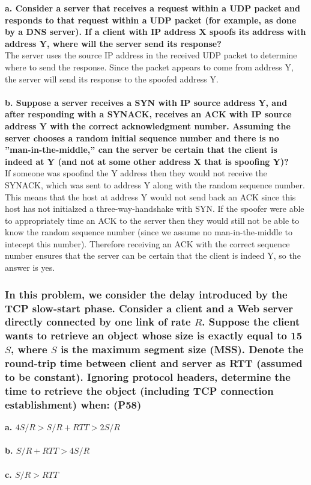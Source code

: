 \textbf{a. Consider a server that receives a request within a UDP packet and responds to that request within a UDP packet (for example, as done by a DNS server). If a client with IP address X spoofs its address with address Y, where will the server send its response?} \\
The server uses the source IP address in the received UDP packet to determine where to send the response. Since the packet appears to come from address Y, the server will send its response to the spoofed address Y. \\
\\
\textbf{b. Suppose a server receives a SYN with IP source address Y, and after responding with a SYNACK, receives an ACK with IP source address Y with the correct acknowledgment number. Assuming the server chooses a random initial sequence number and there is no ''man-in-the-middle,'' can the server be certain that the client is indeed at Y (and not at some other address X that is spoofing Y)?} \\
If someone was spoofind the Y address then they would not receive the SYNACK, which was sent to address Y along with the random sequence number. This means that the host at address Y would not send back an ACK since this host has not initialzed a three-way-handshake with SYN. If the spoofer were able to appropriately time an ACK to the server then they would still not be able to know the random sequence number (since we assume no man-in-the-middle to intecept this number). Therefore receiving an ACK with the correct sequence number ensures that the server can be certain that the client is indeed Y, so the answer is yes.

\subsubsection{In this problem, we consider the delay introduced by the TCP slow-start phase. Consider a client and a Web server directly connected by one link of rate $R$. Suppose the client wants to retrieve an object whose size is exactly equal to 15 $S$, where $S$ is the maximum segment size (MSS). Denote the round-trip time between client and server as RTT (assumed to be constant). Ignoring protocol headers, determine the time to retrieve the object (including TCP connection establishment) when: (P58)}

\textbf{a. $4 S/R > S/R + RTT > 2 S/R$} \\
\\
\textbf{b. $S/R + RTT > 4 S/R$} \\
\\
\textbf{c. $S/R > RTT$} \\
